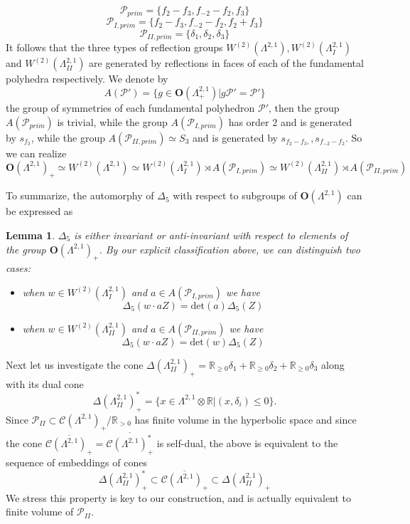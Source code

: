 \documentclass[9pt]{amsart} \usepackage[utf8]{inputenc}
\newtheorem{lemma}{Lemma}
\newcommand{\R}{\mathbb{R}} \newcommand{\La}{\Lambda}
\newcommand{\Orth}{\mathbf{O}}
\newcommand{\Cone}{\mathcal{C}}
\newcommand{\Poly}{\mathcal{P}}
\begin{document}
 $$\Poly_{prim} = \{f_2 - f_3, f_{-2} - f_2, f_3\}$$
 $$\Poly_{I,prim} = \{f_2 -f_3, f_{-2} - f_2, f_2 + f_3\}$$
 $$\Poly_{II,prim} = \{\delta_1, \delta_2, \delta_3\}$$
It follows that the three types of reflection groups $W^{(2)}(\La^{2,1}),
W^{(2)}(\La^{2,1}_I)$ and $W^{(2)}(\La^{2,1}_{II})$ are generated by
reflections in faces of each of the fundamental polyhedra respectively. We denote
by $$A(\Poly') = \{g \in \Orth(\La^{2,1}_+) | g \Poly' = \Poly' \}$$ the
group of symmetries of each fundamental polyhedron $\Poly'$, then the group
$A(\Poly_{prim})$ is trivial, while the group $A(\Poly_{I,prim})$ has order
$2$ and is generated by $s_{f_3}$, while the group $A(\Poly_{II,prim})
\simeq S_3$ and is generated by $s_{f_2 -f_3,}, s_{f_{-2} - f_2}$. So we
can realize $$\Orth(\La^{2,1})_+ \simeq W^{(2)}(\La^{2,1}) \simeq
W^{(2)}(\La^{2,1}_I) \rtimes A(\Poly_{I,prim}) \simeq
W^{(2)}(\La^{2,1}_{II}) \rtimes A(\Poly_{II,prim})$$

To summarize, the automorphy of $\Delta_5$ with respect to subgroups of
$\Orth(\La^{2,1})$ can be expressed as

\begin{lemma}
$\Delta_5$ is either invariant or anti-invariant with respect to elements
of the group $\Orth(\La^{2,1})_+$. By our explicit classification above, we can
distinguish two cases:
\begin{itemize}
  \item when $w \in W^{(2)}(\La^{2,1}_I)$ and $a \in A(\Poly_{I,prim})$ we
  have
  $$\Delta_5(w \cdot a Z) = \text{det}(a) \Delta_5(Z)$$
  \item when $w \in W^{(2)}(\La^{2,1}_{II})$ and $a \in A(\Poly_{II,prim})$ we
  have
  $$\Delta_5(w \cdot a Z) = \text{det}(w) \Delta_5(Z)$$
\end{itemize}

\end{lemma}

Next let us investigate the cone $\Delta(\La^{2,1}_{II})_+ = \R_{\geq 0} \delta_1 + \R_{\geq 0} \delta_2
+ \R_{\geq 0} \delta_3$ along with its dual cone
$$\Delta(\La^{2,1}_{II})_+^* = \{ x \in \La^{2,1} \otimes \R | (x,
\delta_i) \leq 0 \}.$$ Since $\Poly_{II} \subset \Cone(\La^{2,1})_+ /
\R_{>0}$ has finite volume in the hyperbolic space and since the cone
$\overline{\Cone(\La^{2,1})_+} = \overline{\Cone(\La^{2,1})_+^*}$ is
self-dual, the above is equivalent to the sequence of embeddings of
cones
$$\Delta(\La^{2,1}_{II})_+^* \subset
\overline{\Cone(\La^{2,1})_+} \subset  \Delta(\La^{2,1}_{II})_+$$
We stress this property is key to our construction, and is actually equivalent to
finite volume of $\Poly_{II}$.
\end{document}

